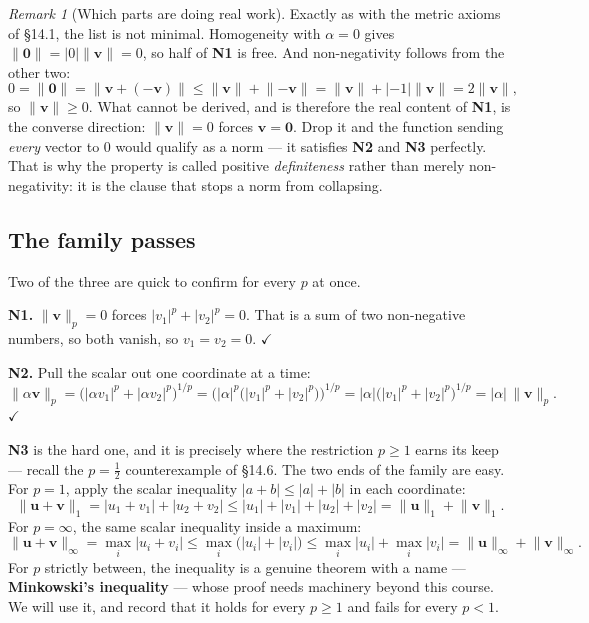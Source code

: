 \documentclass[11pt]{article}
\theoremstyle{definition}
\theoremstyle{remark}
\newtheorem*{rmk}{Remark}
\newcommand{\vc}[1]{\mathbf{#1}}
\newcommand{\norm}[1]{\lVert #1\rVert}
\begin{document}
\begin{rmk}[Which parts are doing real work]
Exactly as with the metric axioms of \S14.1, the list is not minimal.
Homogeneity with $\alpha=0$ gives $\norm{\vc{0}}=\lvert 0\rvert\norm{\vc{v}}=0$,
so half of \textbf{N1} is free. And non-negativity follows from the other two:
\[
  0 = \norm{\vc{0}} = \norm{\vc{v}+(-\vc{v})}
    \le \norm{\vc{v}}+\norm{-\vc{v}}
    = \norm{\vc{v}}+\lvert-1\rvert\norm{\vc{v}}
    = 2\norm{\vc{v}} ,
\]
so $\norm{\vc{v}}\ge0$. What cannot be derived, and is therefore the real
content of \textbf{N1}, is the converse direction: $\norm{\vc{v}}=0$ forces
$\vc{v}=\vc{0}$. Drop it and the function sending \emph{every} vector to $0$
would qualify as a norm --- it satisfies \textbf{N2} and \textbf{N3} perfectly.
That is why the property is called positive \emph{definiteness} rather than
merely non-negativity: it is the clause that stops a norm from collapsing.
\end{rmk}

\subsection{The family passes}
Two of the three are quick to confirm for every $p$ at once.

\smallskip
\noindent\textbf{N1.} $\norm{\vc{v}}_p=0$ forces
$\lvert v_1\rvert^{p}+\lvert v_2\rvert^{p}=0$. That is a sum of two
non-negative numbers, so both vanish, so $v_1=v_2=0$. \hfill$\checkmark$

\smallskip
\noindent\textbf{N2.} Pull the scalar out one coordinate at a time:
\[
  \norm{\alpha\vc{v}}_p
  = \bigl(\lvert\alpha v_1\rvert^{p}+\lvert\alpha v_2\rvert^{p}\bigr)^{1/p}
  = \bigl(\lvert\alpha\rvert^{p}
     \bigl(\lvert v_1\rvert^{p}+\lvert v_2\rvert^{p}\bigr)\bigr)^{1/p}
  = \lvert\alpha\rvert
     \bigl(\lvert v_1\rvert^{p}+\lvert v_2\rvert^{p}\bigr)^{1/p}
  = \lvert\alpha\rvert\,\norm{\vc{v}}_p .
\]
\hfill$\checkmark$

\smallskip
\noindent\textbf{N3} is the hard one, and it is precisely where the restriction
$p\ge1$ earns its keep --- recall the $p=\tfrac12$ counterexample of \S14.6. The
two ends of the family are easy. For $p=1$, apply the scalar inequality
$\lvert a+b\rvert\le\lvert a\rvert+\lvert b\rvert$ in each coordinate:
\[
  \norm{\vc{u}+\vc{v}}_1
  = \lvert u_1+v_1\rvert+\lvert u_2+v_2\rvert
  \le \lvert u_1\rvert+\lvert v_1\rvert+\lvert u_2\rvert+\lvert v_2\rvert
  = \norm{\vc{u}}_1+\norm{\vc{v}}_1 .
\]
For $p=\infty$, the same scalar inequality inside a maximum:
\[
  \norm{\vc{u}+\vc{v}}_\infty
  = \max_i\lvert u_i+v_i\rvert
  \le \max_i\bigl(\lvert u_i\rvert+\lvert v_i\rvert\bigr)
  \le \max_i\lvert u_i\rvert+\max_i\lvert v_i\rvert
  = \norm{\vc{u}}_\infty+\norm{\vc{v}}_\infty .
\]
For $p$ strictly between, the inequality is a genuine theorem with a name ---
\textbf{Minkowski's inequality} --- whose proof needs machinery beyond this
course. We will use it, and record that it holds for every $p\ge1$ and fails for
every $p<1$.
\end{document}
